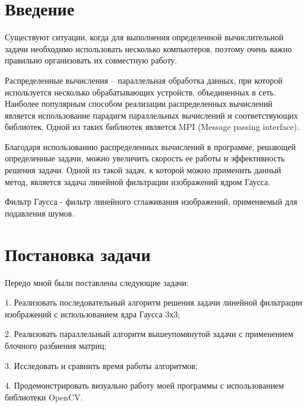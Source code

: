 \documentclass{report}
\begin{document}
\setcounter{page}{2}

\tableofcontents
\newpage

\section*{Введение}
\par Существуют ситуации, когда для выполнения определенной вычислительной задачи необходимо использовать несколько компьютеров, поэтому очень важно правильно организовать их совместную работу. 
\par Распределенные вычисления – параллельная обработка данных, при которой используется несколько обрабатывающих устройств, объединенных в сеть. Наиболее популярным способом реализации распределенных вычислений является использование парадигм параллельных вычислений и соответствующих библиотек. Одной из таких библиотек является MPI (Message passing interface). 
\par Благодаря использованию распределенных вычислений в программе, решающей определенные задачи, можно увеличить скорость ее работы и эффективность решения задачи. Одной из такой задач, к которой можно применить данный метод, является задача линейной фильтрации изображений ядром Гаусса. 
\par Фильтр Гаусса - фильтр линейного сглаживания изображений, применяемый для подавления шумов.
\newpage

\section*{Постановка задачи}
\par Передо мной были поставлены следующие задачи: 
\par 1. Реализовать последовательный алгоритм решения задачи линейной фильтрации изображений с использованием ядра Гаусса 3х3; 
\par 2. Реализовать параллельный алгоритм вышеупомянутой задачи с применением блочного разбиения матриц; 
\par 3. Исследовать и сравнить время работы алгоритмов; 
\par 4. Продемонстрировать визуально работу моей программы с использованием библиотеки OpenCV.
\newpage

\end{document}
